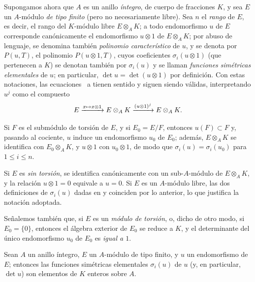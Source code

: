 \documentclass[oneside,10pt]{amsart}
\makeatletter
\renewcommand{\leq}{\leqslant}
\newcommand{\ega@arrow}[2]{\mathchoice{#1}{#2}{#2}{#2}}
\let\ega@shortmapsto\mapsto
\renewcommand{\mapsto}{\ega@arrow{\longmapsto}{\ega@shortmapsto}}
\let\EGAOriginalLabel\label
\renewcommand{\label}[1]{\phantomsection\EGAOriginalLabel{#1}}
\makeatother
\begin{document}
\begin{env}[6.4.2]
\label{II.6.4.2}
Supongamos ahora que $A$ es un anillo \emph{íntegro}, de cuerpo de fracciones $K$, y sea $E$ un $A$-módulo \emph{de tipo finito} (pero no necesariamente libre).
Sea $n$ el \emph{rango} de $E$, es decir, el rango del $K$-módulo libre $E\otimes_A K$;
a todo endomorfismo $u$ de $E$ corresponde canónicamente el endomorfismo $u\otimes1$ de $E\otimes_A K$;
por abuso de lenguaje, se denomina también \emph{polinomio característico} de $u$, y se denota por $P(u,T)$, el polinomio $P(u\otimes1,T)$, cuyos coeficientes $\sigma_i(u\otimes1)$ (que pertenecen a $K$) se denotan también por $\sigma_i(u)$ y se llaman \emph{funciones simétricas elementales} de $u$;
en particular, $\det u=\det(u\otimes1)$ por definición.
Con estas notaciones, las ecuaciones~ a  tienen sentido y siguen siendo válidas, interpretando $u^j$ como el compuesto
\[
  E\xrightarrow{x\mapsto x\otimes1}E\otimes_A K
   \xrightarrow{(u\otimes1)^j}E\otimes_A K.
\]

Si $F$ es el submódulo de torsión de $E$, y si $E_0=E/F$, entonces $u(F)\subset F$ y, pasando al cociente, $u$ induce un endomorfismo $u_0$ de $E_0$;
además, $E\otimes_A K$ se identifica con $E_0\otimes_A K$, y $u\otimes1$ con $u_0\otimes1$, de modo que $\sigma_i(u)=\sigma_i(u_0)$ para $1\leq i\leq n$.

Si $E$ es \emph{sin torsión}, se identifica canónicamente con un sub-$A$-módulo de $E\otimes_A K$, y la relación $u\otimes1=0$ equivale a $u=0$.
Si $E$ es un $A$-módulo libre, las dos definiciones de $\sigma_i(u)$ dadas en  y  coinciden por lo anterior, lo que justifica la notación adoptada.

Señalemos también que, si $E$ es un \emph{módulo de torsión}, o, dicho de otro modo, si $E_0=\{0\}$, entonces el álgebra exterior de $E_0$ se reduce a $K$, y el determinante del único endomorfismo $u_0$ de $E_0$ es \emph{igual a $1$}.
\end{env}

\begin{proposition}[6.4.3]
\label{II.6.4.3}
Sean $A$ un anillo íntegro, $E$ un $A$-módulo de tipo finito, y $u$ un endomorfismo de $E$;
entonces las funciones simétricas elementales $\sigma_i(u)$ de $u$ (y, en particular, $\det u$) son elementos de $K$ enteros sobre $A$.
\end{proposition}
\end{document}
